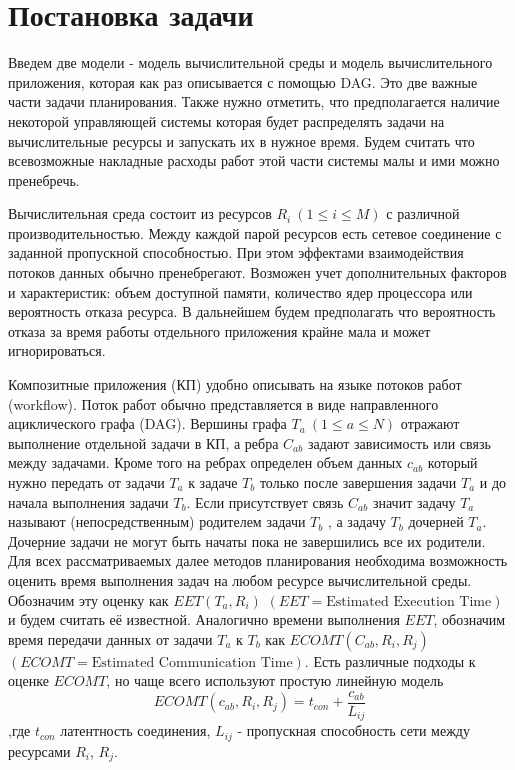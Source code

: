 \chapter*{Постановка задачи}
\begin{spacing}{1.4}

Введем две модели - модель вычислительной среды и модель вычислительного приложения, которая как раз описывается с помощью DAG. Это две важные части задачи планирования. Также нужно отметить, что предполагается наличие некоторой управляющей системы которая будет распределять задачи на вычислительные ресурсы и запускать их в нужное время. Будем считать что всевозможные накладные расходы работ этой части системы малы и ими можно пренебречь.

Вычислительная среда состоит из ресурсов $R_i~(1 \leq i \leq M)$ с различной производительностью. Между каждой парой ресурсов есть сетевое соединение с заданной пропускной способностью. При этом эффектами взаимодействия потоков данных обычно пренебрегают. Возможен учет дополнительных факторов и характеристик: объем доступной памяти, количество ядер процессора или вероятность отказа ресурса. В дальнейшем будем предполагать что вероятность отказа за время работы отдельного приложения крайне мала и может игнорироваться.

Композитные приложения (КП) удобно описывать на языке потоков работ (workflow). Поток работ обычно представляется в виде направленного ациклического графа (DAG). Вершины графа $T_a~(1 \leq a \leq N) $ отражают  выполнение отдельной задачи в КП, а ребра $C_{ab}$ задают зависимость или связь между задачами. Кроме того на ребрах определен объем данных $c_{ab}$ который нужно передать от задачи $T_a$  к задаче $T_b$ только после завершения задачи $T_a$ и до начала выполнения задачи $T_b$.  Если присутствует связь $C_{ab}$ значит задачу  $T_a$ называют (непосредственным) родителем задачи  $T_b$ , а задачу $T_b$ дочерней   $T_a$. Дочерние задачи не могут быть начаты пока не завершились все их родители. Для всех рассматриваемых далее методов планирования необходима возможность оценить время выполнения задач на любом ресурсе вычислительной среды. Обозначим эту оценку как $EET(T_a, R_i)$ $(EET = \text{Estimated Execution Time})$ и будем считать её известной. Аналогично времени выполнения $EET$, обозначим время передачи данных от задачи $T_a$ к $T_b$ как $ECOMT(C_{ab}, R_i, R_j)$ $(ECOMT = \text{Estimated Communication Time})$. Есть различные подходы к оценке $ECOMT$, но чаще всего используют простую линейную модель $$ECOMT (c_{ab}, R_i, R_j) = t_{con} + \frac{c_{ab}}{L_{ij}}$$
,где $t_{con}$ латентность соединения, $L_{ij}$ - пропускная способность сети между ресурсами $R_i$, $R_j$. 


\end{spacing}
